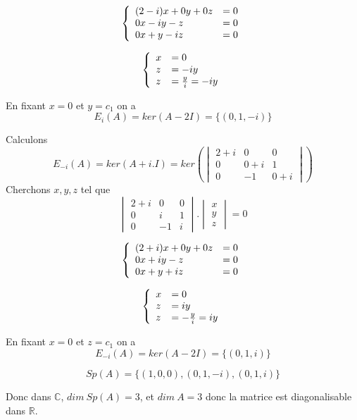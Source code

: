 \documentclass[]{book}
\theoremstyle{definition}
\newcommand{\bb}[1]{\mathbb{#1}}
\newcommand{\R}{\bb{R}}
\newcommand{\C}{\bb{C}}
\begin{document}
$$
\left\{ 
\begin{array}{l l}
(2-i)x  + 0y + 0z & = 0\\
0x  -iy - z & = 0\\
0x +y -iz & = 0\\
\end{array}
\right. 
$$ 

$$
\left\{ 
\begin{array}{l l}
x & = 0\\
z & = -iy \\
z & = \frac{y}{i} = -iy\\
\end{array}
\right. 
$$ 

En fixant $x=0$ et $y=c_1$ on a
$$E_{i}(A)=ker(A-2I) = \{(0,1,-i)\}$$

Calculons 
$$E_{-i}(A)=ker(A+i.I) = ker\left( \begin{vmatrix} 2 + i & 0 & 0 \\ 0 & 0+i  & 1 \\  0 & -1 & 0 + i \end{vmatrix} \right)$$
Cherchons $x,y,z$ tel que
$$\begin{vmatrix} 2+i & 0 & 0 \\ 0 & i & 1 \\  0 & -1 & i \end{vmatrix} . \begin{vmatrix} x \\ y \\  z \end{vmatrix} = 0$$

$$
\left\{ 
\begin{array}{l l}
(2+i)x  + 0y + 0z & = 0\\
0x  + iy - z & = 0\\
0x +y + iz & = 0\\
\end{array}
\right. 
$$ 

$$
\left\{ 
\begin{array}{l l}
x & = 0\\
z & = iy \\
z & = -\frac{y}{i} = iy\\
\end{array}
\right. 
$$ 

En fixant $x=0$ et $z=c_1$ on a
$$E_{-i}(A)=ker(A-2I) = \{(0,1,i)\}$$

$$Sp(A) = \{(1,0,0), (0,1,-i), (0,1,i)\}$$

Donc dans $\C$, $dim\ Sp(A) = 3$, et $dim\ A = 3$ donc la matrice est diagonalisable dans $\R$.
\end{document}
